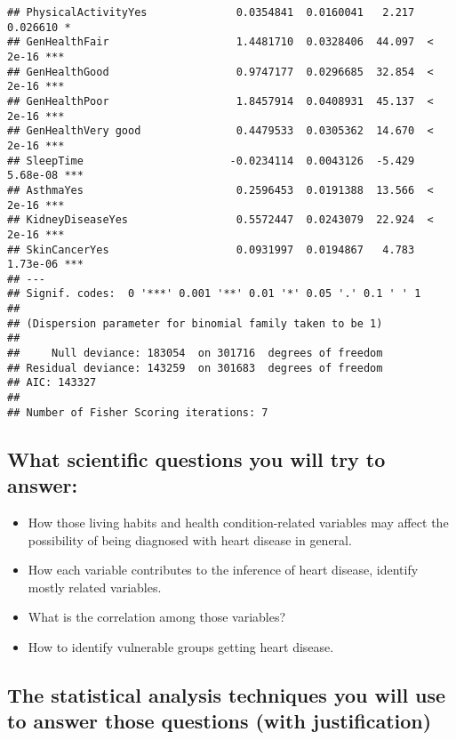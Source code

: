\documentclass[
  11pt,
]{article}
\begin{document}
\begin{verbatim}
## PhysicalActivityYes              0.0354841  0.0160041   2.217 0.026610 *  
## GenHealthFair                    1.4481710  0.0328406  44.097  < 2e-16 ***
## GenHealthGood                    0.9747177  0.0296685  32.854  < 2e-16 ***
## GenHealthPoor                    1.8457914  0.0408931  45.137  < 2e-16 ***
## GenHealthVery good               0.4479533  0.0305362  14.670  < 2e-16 ***
## SleepTime                       -0.0234114  0.0043126  -5.429 5.68e-08 ***
## AsthmaYes                        0.2596453  0.0191388  13.566  < 2e-16 ***
## KidneyDiseaseYes                 0.5572447  0.0243079  22.924  < 2e-16 ***
## SkinCancerYes                    0.0931997  0.0194867   4.783 1.73e-06 ***
## ---
## Signif. codes:  0 '***' 0.001 '**' 0.01 '*' 0.05 '.' 0.1 ' ' 1
## 
## (Dispersion parameter for binomial family taken to be 1)
## 
##     Null deviance: 183054  on 301716  degrees of freedom
## Residual deviance: 143259  on 301683  degrees of freedom
## AIC: 143327
## 
## Number of Fisher Scoring iterations: 7
\end{verbatim}

\hypertarget{what-scientific-questions-you-will-try-to-answer}{%
\subsection{What scientific questions you will try to
answer:}\label{what-scientific-questions-you-will-try-to-answer}}

\begin{itemize}
\item
  How those living habits and health condition-related variables may
  affect the possibility of being diagnosed with heart disease in
  general.
\item
  How each variable contributes to the inference of heart disease,
  identify mostly related variables.
\item
  What is the correlation among those variables?
\item
  How to identify vulnerable groups getting heart disease.
\end{itemize}

\hypertarget{the-statistical-analysis-techniques-you-will-use-to-answer-those-questions-with-justification}{%
\subsection{The statistical analysis techniques you will use to answer
those questions (with
justification)}\label{the-statistical-analysis-techniques-you-will-use-to-answer-those-questions-with-justification}}
\end{document}
